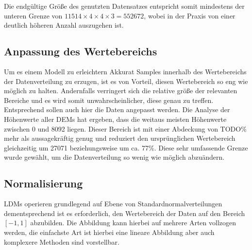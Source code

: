 Die endgültige Größe des genutzten Datensatzes entspricht somit mindestens der unteren Grenze von $11514\times4\times4\times3 = 552672$, wobei in der Praxis von einer deutlich höheren Anzahl auszugehen ist.


\subsection{Anpassung des Wertebereichs}

Um es einem Modell zu erleichtern Akkurat Samples innerhalb des Wertebereichs der Datenverteilung zu erzugen, ist es von Vorteil, diesen Wertebereich so eng wie möglich zu halten. Andernfalls verringert sich die relative größe der relevanten Bereiche und es wird somit unwahrscheinlicher, diese genau zu treffen. Entsprechend sollen auch hier die Daten angepasst werden. 
Die Analyse der Höhenwerte aller DEMs hat ergeben, dass die weitaus meisten Höhenwerte zwischen 0 und 8092 liegen. Dieser Bereich ist mit einer Abdeckung von TODO\% mehr als aussagekräftig genug und reduziert den ursprünglichen Wertebereich gleichzeitig um 27071 beziehungsweise um ca. 77\%. 
Diese sehr umfassende Grenze wurde gewählt, um die Datenverteilung so wenig wie möglich abzuändern. 

\subsection{Normalisierung}

LDMs operieren grundlegend auf Ebene von Standardnormalverteilungen dementsprechend ist es erforderlich, den Wertebereich der Daten auf den Bereich $\left [ -1, 1\right ]$ abzubilden. Die Abbildung kann hierbei auf mehrere Arten vollzogen werden, die einfachste Art ist hierbei eine lineare Abbildung aber auch komplexere Methoden sind vorstellbar. 


